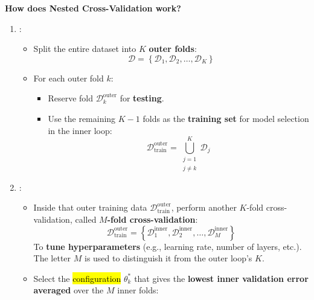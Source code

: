 \highspace
\begin{flushleft}
    \textcolor{Green3}{ \textbf{How does Nested Cross-Validation work?}}
\end{flushleft}
\begin{enumerate}
    \item {}:
    \begin{itemize}
        \item Split the entire dataset into $K$ \textbf{outer folds}:
        \begin{equation*}
            \mathcal{D} = \left\{ \mathcal{D}_1, \mathcal{D}_2, \ldots, \mathcal{D}_K \right\}
        \end{equation*}
        \item For each outer fold $k$:
        \begin{itemize}
            \item Reserve fold $\mathcal{D}_k^{\text{outer}}$ for \textbf{testing}.
            \item Use the remaining $K-1$ folds as the \textbf{training set} for model selection in the inner loop:
            \begin{equation*}
                \mathcal{D}_{\text{train}}^{\text{outer}} = \bigcup_{\substack{j=1 \\ j \neq k}}^{K} \mathcal{D}_j
            \end{equation*}
        \end{itemize}
    \end{itemize}
    \item {}:
    \begin{itemize}
        \item Inside that outer training data $\mathcal{D}_{\text{train}}^{\text{outer}}$, perform another $K$-fold cross-validation, called \textbf{$M$-fold cross-validation}:
        \begin{equation*}
            \mathcal{D}_{\text{train}}^{\text{outer}} = \left\{ \mathcal{D}_1^{\text{inner}}, \mathcal{D}_2^{\text{inner}}, \ldots, \mathcal{D}_M^{\text{inner}} \right\}
        \end{equation*}
        To \textbf{tune hyperparameters} (e.g., learning rate, number of layers, etc.). The letter $M$ is used to distinguish it from the outer loop's $K$.
        \item Select the \hl{configuration} $\theta^{*}_{k}$ that gives the \textbf{lowest inner validation error averaged} over the $M$ inner folds:

\end{itemize}
\end{enumerate}
